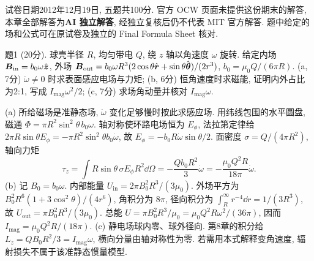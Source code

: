 试卷日期2012年12月19日, 五题共100分. 官方 OCW 页面未提供这份期末的解答, 本章全部解答为\textbf{AI 独立解答}, 经独立复核后仍不代表 MIT 官方解答. 题中给定的场和公式可在原试卷及独立的 Final Formula Sheet 核对.

\begin{exercise}
题1 (20分). 球壳半径 $R$, 均匀带电 $Q$, 绕 $z$ 轴以角速度 $\omega$ 旋转. 给定内场 $\boldsymbol{B}_\mathrm{in}=b_0\omega\hat{\boldsymbol{z}}$, 外场 $\boldsymbol{B}_\mathrm{out}=b_0\omega R^3(2\cos\theta\hat{\boldsymbol{r}}+\sin\theta\hat{\boldsymbol{\theta}})/(2r^3)$, $b_0=\mu_0Q/(6\pi R)$. (a, 7分) $\dot\omega\ne0$ 时求表面感应电场与力矩; (b, 6分) 恒角速度时求磁能, 证明内外占比为2:1, 写成 $I_\mathrm{mag}\omega^2/2$; (c, 7分) 求场角动量并核对 $I_\mathrm{mag}\omega$.
\end{exercise}
\begin{solution}
(a) 所给磁场是准静态场, $\dot\omega$ 变化足够慢时按此求感应场. 用纬线包围的水平圆盘, 磁通 $\Phi=\pi R^2\sin^2\theta\,b_0\omega$. 轴对称使环路电场恒为 $E_\phi$, 法拉第定律给 $2\pi R\sin\theta E_\phi=-\pi R^2\sin^2\theta b_0\dot\omega$, 故 $E_\phi=-b_0R\dot\omega\sin\theta/2$. 面密度 $\sigma=Q/(4\pi R^2)$, 轴向力矩
\[
\tau_z=\int R\sin\theta\,\sigma E_\phi R^2\dd\Omega
=-\frac{Qb_0R^2}3\dot\omega=-\frac{\mu_0Q^2R}{18\pi}\dot\omega.
\]
(b) 记 $B_0=b_0\omega$. 内部能量 $U_\mathrm{in}=2\pi B_0^2R^3/(3\mu_0)$. 外场平方为 $B_0^2R^6(1+3\cos^2\theta)/(4r^6)$, 角积分为 $8\pi$, 径向积分为 $\int_R^\infty r^{-4}\dd r=1/(3R^3)$, 故 $U_\mathrm{out}=\pi B_0^2R^3/(3\mu_0)$. 总能 $U=\pi B_0^2R^3/\mu_0=\mu_0Q^2R\omega^2/(36\pi)$, 因而 $I_\mathrm{mag}=\mu_0Q^2R/(18\pi)$.
(c) 静电场球内零、球外径向. 第8章的积分给 $L_z=QB_0R^2/3=I_\mathrm{mag}\omega$, 横向分量由轴对称性为零. 若需用本式解释变角速度, 辐射损失不属于该准静态惯量模型.
\end{solution}

